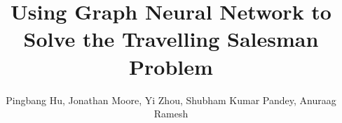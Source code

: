 \documentclass[20pt,,margin=1in,innermargin=-4.5in,blockverticalspace=-0.25in]{tikzposter}
\title{Using Graph Neural Network to Solve the Travelling Salesman Problem}
\author{Pingbang Hu, Jonathan Moore, Yi Zhou, Shubham Kumar Pandey, Anuraag Ramesh}
\institute{University of Michigan}
\begin{document}
\maketitle
\centering

\begin{figure}[H]
	\centering
	\label{fig:pipeline}
\end{figure}
\end{document}
